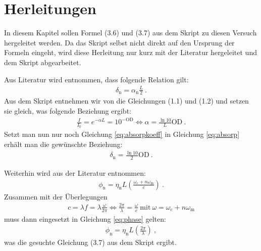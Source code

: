 
\section{Herleitungen}
\label{sec:herleitung}

In diesem Kapitel sollen Formel (3.6) und (3.7) aus dem Skript zu diesen Versuch hergeleitet werden. Da das Skript selbst nicht direkt auf den Ursprung der Formeln eingeht, wird diese Herleitung nur kurz mit der Literatur  hergeleitet und dem Skript abgearbeitet.

Aus Literatur  wird entnommen, dass folgende Relation gilt:
\begin{gather}
    \delta_\mathrm{n} = \alpha_\mathrm{n} \frac{L}{2}~.
    \label{eq:absorp}
\end{gather}
Aus dem Skript entnehmen wir von die Gleichungen (1.1) und (1.2) und setzen sie gleich, was folgende Beziehung ergibt:
\begin{gather}
    \frac{I}{I_0} = e^{-\alpha L} = 10^{-\mathrm{OD}} \Leftrightarrow \alpha = \frac{\ln 10}{L} \mathrm{OD}~.
    \label{eq:absorpkoeff}
\end{gather}
Setzt man nun nur noch Gleichung \ref{eq:absorpkoeff} in Gleichung \ref{eq:absorp} erhält man die gewünschte Beziehung:
\begin{gather}
    \boxed{\delta_\mathrm{n} = \frac{\ln 10}{2} \mathrm{OD}}~.
\end{gather}

Weiterhin wird aus der Literatur  entnommen:
\begin{gather}
    \phi_\mathrm{n} = \eta_\mathrm{n} L \left( \frac{\omega_\mathrm{c} + n \omega_\mathrm{m}}{c} \right)~.
    \label{eq:phase}
\end{gather}
Zusammen mit der Überlegungen
\begin{gather}
    c = \lambda f = \lambda \frac{\omega}{2\pi} \Leftrightarrow \frac{2\pi}{\lambda} = \frac{\omega}{c}~\mathrm{mit}~\omega=\omega_\mathrm{c} + n \omega_\mathrm{m}
\end{gather}
muss dann eingesetzt in Gleichung \ref{eq:phase} gelten:
\begin{gather}
    \boxed{\phi_\mathrm{n} = \eta_\mathrm{n} L \left( \frac{2\pi}{\lambda} \right)}~,
\end{gather}
was die gesuchte Gleichung (3.7) aus dem Skript ergibt.